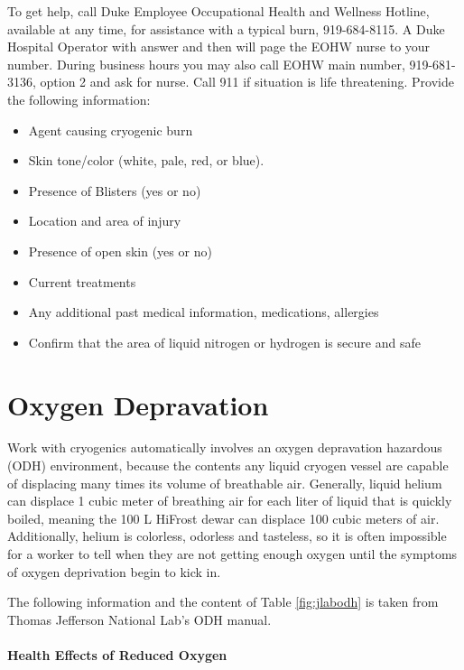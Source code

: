 To get help\cite{epling}, call Duke Employee Occupational Health and Wellness Hotline, available at any time, for assistance with a typical burn, 919-684-8115.  A Duke Hospital Operator with answer and then will page the EOHW nurse to your number.  During business hours you may also call EOHW main number, 919-681-3136, option 2 and ask for nurse.  Call 911 if situation is life threatening.  Provide the following information\cite{epling}:

\begin{itemize}
\item Agent causing cryogenic burn
\item Skin tone/color (white, pale, red, or blue).
\item Presence of Blisters (yes or no)
\item Location and area of injury
\item Presence of open skin (yes or no)
\item Current treatments
\item Any additional past medical information, medications, allergies
\item Confirm that the area of liquid nitrogen or hydrogen is secure and safe
\end{itemize}

\section{Oxygen Depravation}

Work with cryogenics automatically involves an oxygen depravation hazardous (ODH) environment, because the contents any liquid cryogen vessel are capable of displacing many times its volume of breathable air.  Generally, liquid helium can displace 1 cubic meter of breathing air for each liter of liquid that is quickly boiled, meaning the 100 L HiFrost dewar can displace 100 cubic meters of air.  Additionally, helium is colorless, odorless and tasteless, so it is often impossible for a worker to tell when they are not getting enough oxygen until the symptoms of oxygen deprivation begin to kick in.

The following information and the content of Table \ref{fig:jlabodh} is taken from Thomas Jefferson National Lab's ODH manual. \cite{jlabodh}

\paragraph{Health Effects of Reduced Oxygen}

